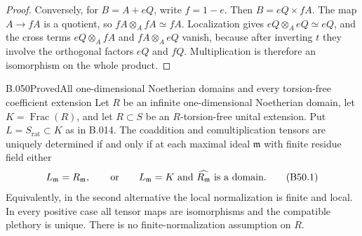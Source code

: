 \begin{proof}
Conversely, for $B=A+eQ$, write $f=1-e$. Then
$B=eQ\times fA$. The map $A\to fA$ is a quotient,
so $fA\otimes_A fA\simeq fA$. Localization gives
$eQ\otimes_A eQ\simeq eQ$, and the cross terms
$eQ\otimes_A fA$ and $fA\otimes_A eQ$ vanish,
because after inverting $t$ they involve the
orthogonal factors $eQ$ and $fQ$. Multiplication
is therefore an isomorphism on the whole product.
\end{proof}

\begin{saresult}{B.050}{Proved}{All one-dimensional Noetherian domains and every torsion-free coefficient extension}
Let $R$ be an infinite one-dimensional Noetherian domain,
let $K=\operatorname{Frac}(R)$, and let $R\subset S$
be an $R$-torsion-free unital extension. Put
$L=S_{\mathrm{rat}}\subset K$ as in B.014.
The coaddition and comultiplication tensors are
uniquely determined if and only if at each maximal
ideal $\mathfrak m$ with finite residue field either
\[
 L_{\mathfrak m}=R_{\mathfrak m},
 \qquad\hbox{or}\qquad
 L_{\mathfrak m}=K\ \hbox{and}\
 \widehat{R_{\mathfrak m}}\hbox{ is a domain}.              \tag{B50.1}
\]
Equivalently, in the second alternative the local
normalization is finite and local. In every positive
case all tensor maps are isomorphisms and the
compatible plethory is unique. There is no
finite-normalization assumption on $R$.
\end{saresult}
